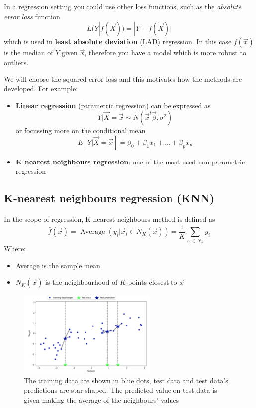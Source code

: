     In a regression setting you could use other loss functions, such as the \textit{absolute error loss} function
    $$L(Y|f(\vec{X})) = |Y - f(\vec{X})|$$
    which is used in \textbf{least absolute deviation} (LAD) regression. In this case $f(\vec{x})$ is the median of $Y$ given $\vec{x}$, therefore you have a model which is more robust to outliers.

    We will choose the squared error loss and this motivates how the methods are developed.
    For example:
    \begin{itemize}
      \item \textbf{Linear regression} (parametric regression) can be expressed as 
            $$Y|\vec{X} = \vec{x} \sim N(\vec{x}^t\vec{\beta}, \sigma^2)$$ 
            or focussing more on the conditional mean
            $$E[Y|\vec{X} = \vec{x}] = \beta_0 + \beta_1x_1 + \dots + \beta_px_p$$
      \item \textbf{K-nearest neighbours regression}: one of the most used non-parametric regression
    \end{itemize}

    \subsection{K-nearest neighbours regression (KNN)}
    
      In the scope of regression, K-nearest neighbours method is defined as
$$\hat{f}(\vec{x}) = \text{ Average } (y_i | \vec{x}_i \in N_K(\vec{x})) = \frac{1}{K} \sum_{x_i \in N_\vec{x}} {y_i} $$ %
      Where:
      \begin{itemize}
        \item Average is the sample mean
        \item $N_K(\vec{x})$ is the neighbourhood of $K$ points closest to $\vec{x}$
      \end{itemize}

\begin{figure}[h]
\caption{The training data are shown in blue dots, test data and test data's predictions are star-shaped. The predicted value on test data is given making the average of the neighbours' values}
\centering
\includegraphics[width=0.6\textwidth]{KNNregression}
\end{figure}


